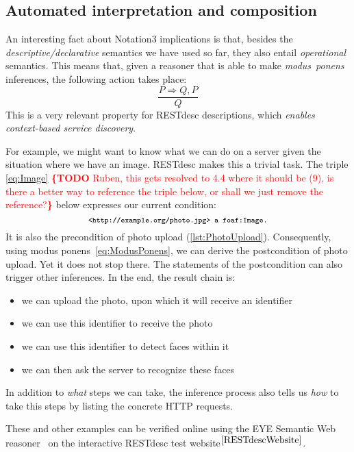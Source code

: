 \documentclass[runningheads,a4paper, twocolumn]{llncs}
\newcommand{\todo}[1]{\noindent\textcolor{red}{{\bf \{TODO} #1{\bf \}}}}
\begin{document}
\subsection{Automated interpretation and composition}
\label{Composition}
An interesting fact about Notation3 implications is that, besides the \emph{descriptive/declarative} semantics we have used so far, they also entail \emph{operational} semantics. This means that, given a reasoner that is able to make \emph{modus~ponens} inferences, the following action takes place:
\begin{equation}\label{eq:ModusPonens}
    \frac{P \Rightarrow Q, P}{Q}
\end{equation}
This is a very relevant property for RESTdesc descriptions, which \emph{enables context-based service discovery}.

For example, we might want to know what we can do on a server given the situation where we have an image. RESTdesc makes this a trivial task. The triple \ref{eq:Image} \todo{Ruben, this gets resolved to 4.4 where it should be (9), is there a better way to reference the triple below, or shall we just remove the reference?} below expresses our current condition:
\begin{equation}\label{eq:Image}
    {\fontsize{8}{10}\texttt{<http://example.org/photo.jpg> a foaf:Image.}}
\end{equation}
It is also the precondition of photo upload (\autoref{lst:PhotoUpload}). Consequently, using modus ponens~\ref{eq:ModusPonens}, we can derive the postcondition of photo upload. Yet it does not stop there. The statements of the postcondition can also trigger other inferences. In the end, the result chain is:
\begin{itemize}
\item we can upload the photo, upon which it will receive an identifier
\item we can use this identifier to receive the photo
\item we can use this identifier to detect faces within it
\item we can then ask the server to recognize these faces
\end{itemize}
In addition to \emph{what} steps we can take, the inference process also tells us \emph{how} to take this steps by listing the concrete HTTP requests.

These and other examples can be verified online using the EYE Semantic Web reasoner~\cite{Euler} on the interactive RESTdesc test website$^{\ref{RESTdescWebsite}}$.
\end{document}
